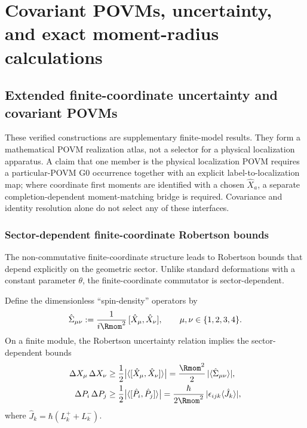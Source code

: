 \documentclass[11pt,a4paper]{article}
\begin{document}
\section{Covariant POVMs, uncertainty, and exact moment-radius calculations}
\label{p2ftech:sec:localization}

\subsection{Extended finite-coordinate uncertainty and covariant POVMs}
\label{p2c:app:extended-finite-coordinate-structure}
These verified constructions are supplementary finite-model results.  They
form a mathematical POVM realization atlas, not a selector for a physical
localization apparatus.  A claim that one member is the physical localization
POVM requires a particular-POVM G0 occurrence together with an explicit
label-to-localization map; where coordinate first moments are identified with
a chosen \(\widehat X_a\), a separate completion-dependent moment-matching
bridge is required.  Covariance and identity resolution alone do not select
any of these interfaces.

\subsubsection{Sector-dependent finite-coordinate Robertson bounds}
\label{p2:subsec:fuzzy-gup}
\label{p2:subsec:finite-coordinate-robertson}
The non-commutative finite-coordinate structure leads to Robertson bounds that depend explicitly on the geometric sector.  Unlike standard deformations with a constant parameter $\theta$, the finite-coordinate commutator is sector-dependent.

\begin{theorem}
\label{p2:thm:spin-dependent-gup}
\label{p2:thm:sector-dependent-coordinate-robertson}
Define the dimensionless ``spin-density'' operators by
\[
\hat\Sigma_{\mu\nu}:=\frac{1}{i\Rmom^2}\,[\hat X_\mu,\hat X_\nu],\qquad \mu,\nu\in\{1,2,3,4\}.
\]
On a finite module, the Robertson uncertainty relation implies the sector-dependent bounds
\begin{align}
\Delta X_\mu\,\Delta X_\nu &\ge \frac{1}{2}\bigl|\langle[\hat X_\mu,\hat X_\nu]\rangle\bigr|
= \frac{\Rmom^2}{2}\,|\langle \hat{\Sigma}_{\mu\nu} \rangle|, \\
\Delta P_i\,\Delta P_j &\ge \frac{1}{2}\bigl|\langle[\hat{P}_i,\hat{P}_j]\rangle\bigr|
= \frac{\hbar}{2\Rmom^2}\,|\epsilon_{ijk}\langle \hat J_k\rangle|,
\end{align}
where \(\hat J_k=\hbar(L^+_k+L^-_k)\).
\end{theorem}
\end{document}
